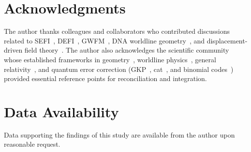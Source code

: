 \documentclass[aip,adv,reprint]{revtex4-2}
\begin{document}
\section{Acknowledgments}

The author thanks colleagues and collaborators who contributed discussions
related to SEFI~\cite{Dutton_SEFI_JMP_2026}, DEFI~\cite{Dutton_DEFI_2026},
GWFM~\cite{Dutton_GWFM_JMP_2026}, DNA worldline geometry~\cite{Dutton_DNA_2026},
and displacement-driven field theory~\cite{Dutton_Unified_JMP_2026}. The author
also acknowledges the scientific community whose established frameworks in
geometry~\cite{Frenet_1851,Serret_1851}, worldline physics~\cite{Wheeler_Feynman_1945,Wheeler_Feynman_1949},
general relativity~\cite{MTW_Gravitation_1973}, and quantum error correction
(GKP~\cite{GKP_2001}, cat~\cite{Mirrahimi_2014}, and binomial codes~\cite{Michael_2016})
provided essential reference points for reconciliation and integration.

\section{Data Availability}

Data supporting the findings of this study are available from the author upon
reasonable request.
\end{document}
